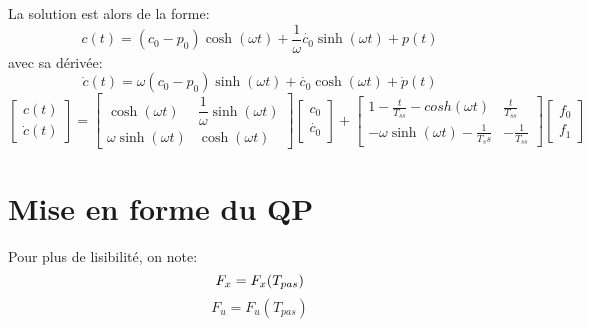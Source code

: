 \documentclass[10pt,a4paper]{article}
\begin{document}
La solution est alors de la forme:
\begin{equation}
c(t)=(c_0-p_0)\cosh(\omega t)+\dfrac{1}{\omega}\dot{c_0}\sinh(\omega t)+p(t)
\end{equation}
avec sa dérivée:
\begin{equation}
\dot{c}(t)=\omega(c_0-p_0)\sinh(\omega t)+\dot{c_0}\cosh(\omega t)+\dot{p}(t)
\end{equation}
\begin{equation}
\begin{bmatrix} 
c(t) \\
\dot{c}(t) 
\end{bmatrix} 
= 
\begin{bmatrix} 
\cosh(\omega t) 		&	 \dfrac{1}{\omega}\sinh(\omega t) \\
\omega\sinh(\omega t)	&	 \cosh(\omega t)
\end{bmatrix}
\begin{bmatrix} 
c_0 \\
\dot{c_0}
\end{bmatrix} 
+
\begin{bmatrix} 
1-\frac{t}{T_{ss}}-cosh(\omega t) 		  & \frac{t}{T_{ss}} \\
-\omega\sinh(\omega t)-	\frac{1}{T_ss} & -	\frac{1}{T_{ss}}
\end{bmatrix}
\begin{bmatrix} 
f_0 \\
f_1
\end{bmatrix}
\end{equation}
\section{Mise en forme du QP}
Pour plus de lisibilité, on note:
\begin{equation}
F_x=F_x(T_{pas})  \linebreak
\end{equation} 
\begin{equation}
F_u=F_u(T_{pas})
\end{equation} 
\end{document}
